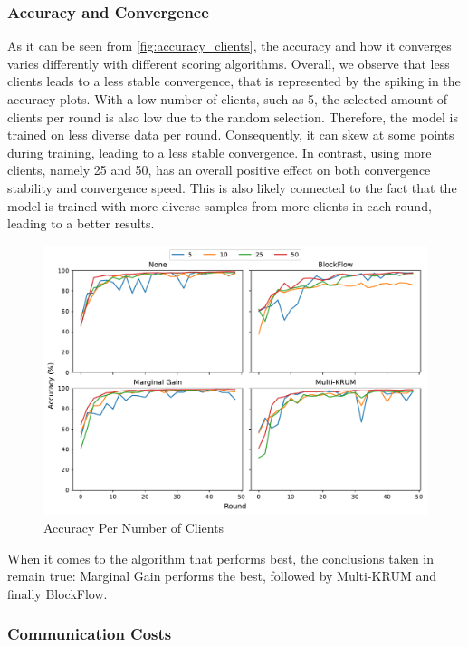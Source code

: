 \subsubsection{Accuracy and Convergence}

As it can be seen from \autoref{fig:accuracy_clients}, the accuracy and how it converges varies differently with different scoring algorithms. Overall, we observe that less clients leads to a less stable convergence, that is represented by the spiking in the accuracy plots. With a low number of clients, such as 5, the selected amount of clients per round is also low due to the random selection. Therefore, the model is trained on less diverse data per round. Consequently, it can skew at some points during training, leading to a less stable convergence. In contrast, using more clients, namely 25 and 50, has an overall positive effect on both convergence stability and convergence speed. This is also likely connected to the fact that the model is trained with more diverse samples from more clients in each round, leading to a better results.

\begin{figure}[!ht]
    \centering
    \includegraphics[width=\textwidth]{graphics/clients/accuracy.pdf}
    \caption{Accuracy Per Number of Clients}
    \label{fig:accuracy_clients}
\end{figure}

When it comes to the algorithm that performs best, the conclusions taken in  remain true: Marginal Gain performs the best, followed by Multi-KRUM and finally BlockFlow.

\subsubsection{Communication Costs}


